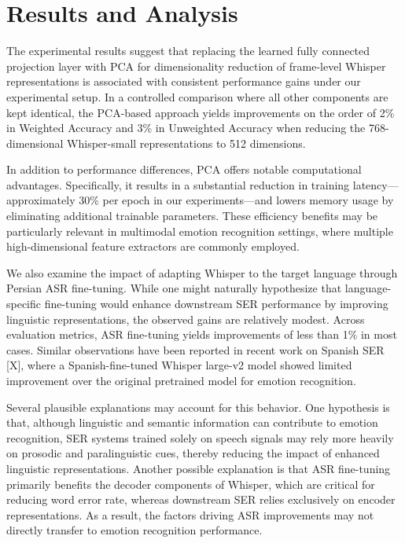 \documentclass[conference]{IEEEtran}
\begin{document}
\section{Results and Analysis}
The experimental results suggest that replacing the learned fully connected projection layer with PCA for dimensionality reduction of frame-level Whisper representations is associated with consistent performance gains under our experimental setup. In a controlled comparison where all other components are kept identical, the PCA-based approach yields improvements on the order of 2\% in Weighted Accuracy and 3\% in Unweighted Accuracy when reducing the 768-dimensional Whisper-small representations to 512 dimensions.

In addition to performance differences, PCA offers notable computational advantages. Specifically, it results in a substantial reduction in training latency—approximately 30\% per epoch in our experiments—and lowers memory usage by eliminating additional trainable parameters. These efficiency benefits may be particularly relevant in multimodal emotion recognition settings, where multiple high-dimensional feature extractors are commonly employed.

We also examine the impact of adapting Whisper to the target language through Persian ASR fine-tuning. While one might naturally hypothesize that language-specific fine-tuning would enhance downstream SER performance by improving linguistic representations, the observed gains are relatively modest. Across evaluation metrics, ASR fine-tuning yields improvements of less than 1\% in most cases. Similar observations have been reported in recent work on Spanish SER [X], where a Spanish-fine-tuned Whisper large-v2 model showed limited improvement over the original pretrained model for emotion recognition.

Several plausible explanations may account for this behavior. One hypothesis is that, although linguistic and semantic information can contribute to emotion recognition, SER systems trained solely on speech signals may rely more heavily on prosodic and paralinguistic cues, thereby reducing the impact of enhanced linguistic representations. Another possible explanation is that ASR fine-tuning primarily benefits the decoder components of Whisper, which are critical for reducing word error rate, whereas downstream SER relies exclusively on encoder representations. As a result, the factors driving ASR improvements may not directly transfer to emotion recognition performance.
\end{document}
